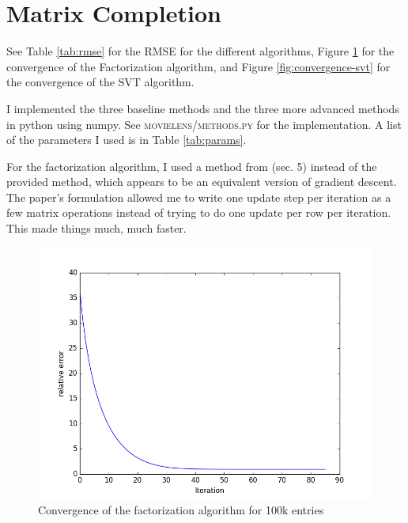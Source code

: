 \documentclass{article}
\begin{document}
\section{Matrix Completion}

See Table \ref{tab:rmse} for the RMSE for the different algorithms, Figure \ref{fig:convergence-factorization} for the convergence of the Factorization algorithm, and Figure \ref{fig:convergence-svt} for the convergence of the SVT algorithm.

I implemented the three baseline methods and the three more advanced methods in python using numpy. See \textsc{movielens/methods.py} for the implementation. A list of the parameters I used is in Table \ref{tab:params}.

For the factorization algorithm, I used a method from \cite{algorithmsNMF} (sec. 5) instead of the provided method, which appears to be an equivalent version of gradient descent. The paper's formulation allowed me to write one update step per iteration as a few matrix operations instead of trying to do one update per row per iteration. This made things much, much faster.

\begin{minipage}{\linewidth}
  \centering
   \label{tab:params}
\end{minipage}


\begin{minipage}{\linewidth}
\centering
{} \label{tab:rmse}
\end{minipage}


\begin{figure}[!ht]
  \includegraphics[width=\textwidth,keepaspectratio=true]{movielens/convergence-factorization-u2.png}
  \caption{Convergence of the factorization algorithm for 100k entries}
  \label{fig:convergence-factorization}
\end{figure}
\end{document}
